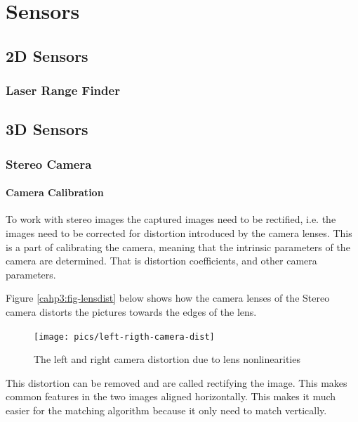 

\chapter{Sensors}


\section{2D Sensors}

\subsection{Laser Range Finder}





\section{3D Sensors}


\subsection{Stereo Camera}



\subsubsection{Camera Calibration}
To work with stereo images the captured images need to be rectified, i.e. the images need
to be corrected for distortion introduced by the camera lenses. This is a part of
calibrating the camera, meaning that the intrinsic parameters of the camera are
determined. That is distortion coefficients, and other camera parameters. 

Figure \ref{cahp3:fig-lensdist} below shows how the camera lenses of the Stereo camera distorts the pictures
towards the edges of the lens. 

\begin{figure}[htbp]
    \centering
    \texttt{[image: pics/left-rigth-camera-dist]}
    \caption{The left and right camera distortion due to lens nonlinearities}
    \label{chap3:fig-lensdist}
\end{figure}

This distortion can be removed and are called rectifying the image. This makes common
features in the two images aligned horizontally. This makes it much easier for the matching
algorithm because it only need to match vertically.





